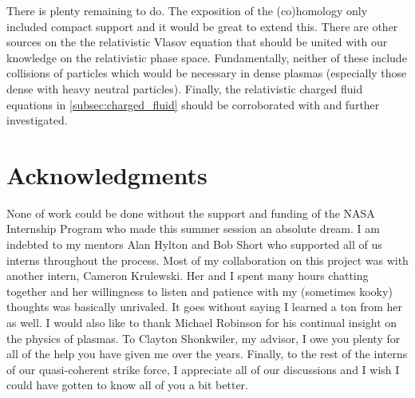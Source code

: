 \documentclass[conf]{new-aiaa}
\begin{document}
There is plenty remaining to do. The exposition of the (co)homology only included compact support and it would be great to extend this. There are other sources on the the relativistic Vlasov equation \cite{brizard_new_2000,marsden_hamiltonian_1982} that should be united with our knowledge on the relativistic phase space. Fundamentally, neither of these include collisions of particles which would be necessary in dense plasmas (especially those dense with heavy neutral particles). Finally, the relativistic charged fluid equations in \cref{subsec:charged_fluid} should be corroborated with \cite{pausader_relativistic_nodate} and further investigated.


\section*{Acknowledgments}

None of work could be done without the support and funding of the NASA Internship Program who made this summer session an absolute dream. I am indebted to my mentors Alan Hylton and Bob Short who supported all of us interns throughout the process. Most of my collaboration on this project was with another intern, Cameron Krulewski. Her and I spent many hours chatting together and her willingness to listen and patience with my (sometimes kooky) thoughts was basically unrivaled. It goes without saying I learned a ton from her as well. I would also like to thank Michael Robinson for his continual insight on the physics of plasmas. To Clayton Shonkwiler, my advisor, I owe you plenty for all of the help you have given me over the years. Finally, to the rest of the interns of our quasi-coherent strike force, I appreciate all of our discussions and I wish I could have gotten to know all of you a bit better.


\end{document}
